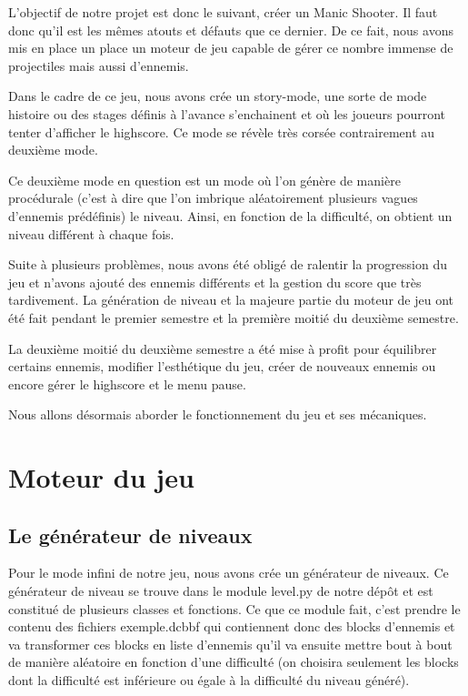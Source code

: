 \documentclass{article}
\begin{document}
L'objectif de notre projet est donc le suivant, créer un Manic Shooter. Il faut donc qu'il est les mêmes atouts et défauts que ce dernier. De ce fait, nous avons mis en place un place un moteur de jeu capable de gérer ce nombre immense de projectiles mais aussi d'ennemis.

Dans le cadre de ce jeu, nous avons crée un story-mode, une sorte de mode histoire ou des stages définis à l'avance s'enchainent et où les joueurs pourront tenter d'afficher le highscore. Ce mode se révèle très corsée contrairement au deuxième mode.

Ce deuxième mode en question est un mode où l'on génère de manière procédurale (c'est à dire que l'on imbrique aléatoirement plusieurs vagues d'ennemis prédéfinis) le niveau. Ainsi, en fonction de la difficulté, on obtient un niveau différent à chaque fois.

Suite à plusieurs problèmes, nous avons été obligé de ralentir la progression du jeu et n'avons ajouté des ennemis différents et la gestion du score que très tardivement. La génération de niveau et la majeure partie du moteur de jeu ont été fait pendant le premier semestre et la première moitié du deuxième semestre.

La deuxième moitié du deuxième semestre a été mise à profit pour équilibrer certains ennemis, modifier l'esthétique du jeu, créer de nouveaux ennemis ou encore gérer le highscore et le menu pause.

Nous allons désormais aborder le fonctionnement du jeu et ses mécaniques.

\section{Moteur du jeu}

\subsection{Le générateur de niveaux}

Pour le mode infini de notre jeu, nous avons crée un générateur de niveaux. Ce générateur de niveau se trouve dans le module level.py de notre dépôt et est constitué de plusieurs classes et fonctions. Ce que ce module fait, c'est prendre le contenu des fichiers exemple.dcbbf qui contiennent donc des blocks d'ennemis et va transformer ces blocks en liste d'ennemis qu'il va ensuite mettre bout à bout de manière aléatoire en fonction d'une difficulté (on choisira seulement les blocks dont la difficulté est inférieure ou égale à la difficulté du niveau généré).
\end{document}
